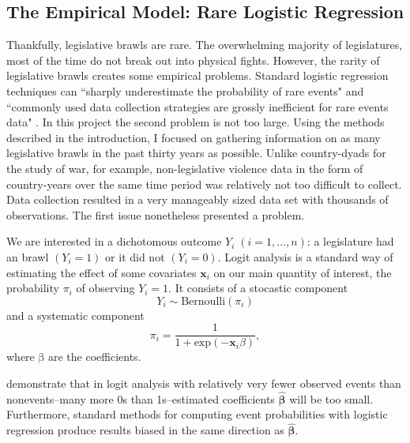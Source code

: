 \documentclass[a4paper]{article}\usepackage{graphicx, color}
\begin{document}
\subsection{The Empirical Model: Rare Logistic Regression}

Thankfully, legislative brawls are rare. The overwhelming majority of legislatures, most of the time do not break out into physical fights. However, the rarity of legislative brawls creates some empirical problems. Standard logistic regression techniques can ``sharply underestimate the probability of rare events" and ``commonly used data collection strategies are grossly inefficient for rare events data" \cite[137]{KingRareEventsPA2001}. In this project the second problem is not too large. Using the methods described in the introduction, I focused on gathering information on as many legislative brawls in the past thirty years as possible. Unlike country-dyads for the study of war, for example, non-legislative violence data in the form of country-years over the same time period was relatively not too difficult to collect. Data collection resulted in a very manageably sized data set with thousands of observations. The first issue nonetheless presented a problem.

We are interested in a dichotomous outcome $Y_{i}\; (i = 1, \ldots, n)$: a legislature had an brawl $(Y_{i} = 1)$ or it did not $(Y_{i} = 0)$. Logit analysis is a standard way of estimating the effect of some covariates $\mathbf{x}_{i}$ on our main quantity of interest, the probability $\pi_{i}$ of observing $Y_{i} = 1$. It consists of a stocastic component
%
\begin{equation}
    Y_{i} \sim \mathrm{Bernoulli}(\pi_{i})
\end{equation}
%
and a systematic component 
%
\begin{equation}
    \pi_{i} = \frac{1}{1 + \mathrm{exp}(-\mathbf{x}_{i} \beta)},
\end{equation}
%
where $\mathrm{\beta}$ are the coefficients.

\cite{KingRareEventsPA2001} demonstrate that in logit analysis with relatively very fewer observed events than nonevents--many more 0s than 1s--estimated coefficients $\mathbf{\hat\beta}$ will be too small. Furthermore, standard methods for computing event probabilities with logistic regression produce results biased in the same direction as $\mathbf{\hat\beta}$. 
\end{document}
